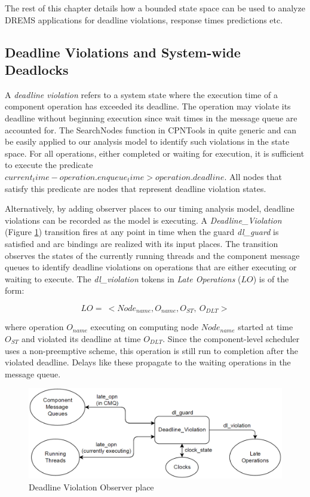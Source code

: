 The rest of this chapter details how a bounded state space can be used to analyze DREMS applications for deadline violations, response times predictions etc. 

\subsection{Deadline Violations and System-wide Deadlocks}

A \emph{deadline violation} refers to a system state where the execution time of a component operation has exceeded its deadline. The operation may violate its deadline without beginning execution since wait times in the message queue are accounted for. The SearchNodes function in CPNTools in quite generic and can be easily applied to our analysis model to identify such violations in the state space. For all operations, either completed or waiting for execution, it is sufficient to execute the predicate $current_time - operation.enqueue_time > operation.deadline$. All nodes that satisfy this predicate are nodes that represent deadline violation states. 

Alternatively, by adding observer places to our timing analysis model, deadline violations can be recorded as the model is executing. A \emph{Deadline\_Violation} (Figure \ref{fig:DL}) transition fires at any point in time when the guard \emph{dl\_guard} is satisfied and arc bindings are realized with its input places. The transition observes the states of the currently running threads and the component message queues to identify deadline violations on operations that are either executing or waiting to execute. The \emph{dl\_violation} tokens in \emph{Late Operations} ($LO$) is of the form:

\begin{equation}
\label{eq:DLV}
LO = \ <Node_{name}, O_{name}, O_{ST}, \ O_{DLT}>
\end{equation}

where operation $O_{name}$ executing on computing node $Node_{name}$ started at time $O_{ST}$ and violated its deadline at time $O_{DLT}$. Since the component-level scheduler uses a non-preemptive scheme, this operation is still run to completion after the violated deadline. Delays like these propagate to the waiting operations in the message queue.


\begin{figure}[htb]
	\centering
	\includegraphics[width=\textwidth]{./img/Deadline_Violations.png}
	\caption{Deadline Violation Observer place}
	\label{fig:DL}
\end{figure}
\FloatBarrier

